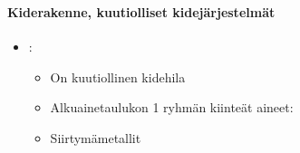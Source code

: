 \begin{frame}
\frametitle{\texorpdfstring{\culine[\sectiontitleulinecolor]{\sectiontitle}}{\sectiontitle} }
\framesubtitle{Kiderakenne, kuutiolliset kidejärjestelmät}
\appear{}


\vspace{1mm}
\begin{minipage}{10.5cm}
\begin{itemize}%
\item {}:
\begin{itemize}
	\item On kuutiollinen kidehila 	
	\item Alkuainetaulukon 1 ryhmän kiinteät aineet: 
	\item Siirtymämetallit
	\end{itemize}


\end{itemize}
\end{minipage}
\end{frame}
